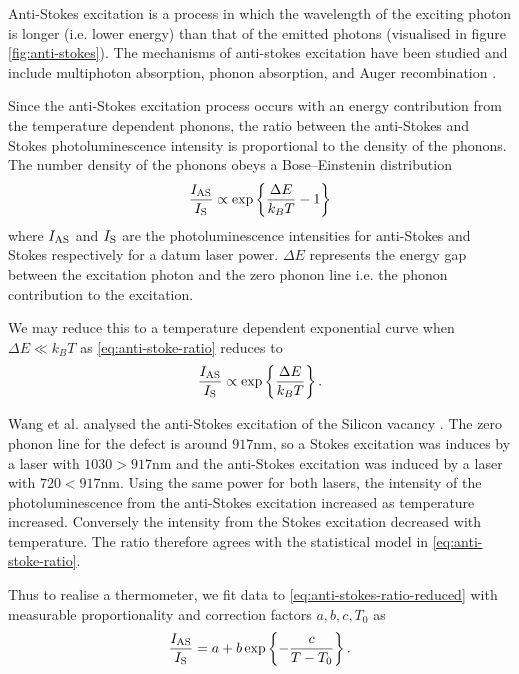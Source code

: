 Anti-Stokes excitation is a process in which the wavelength of the exciting photon is longer (i.e. lower energy) than that
of the emitted photons (visualised in figure \ref{fig:anti-stokes}).  The mechanisms of anti-stokes excitation have been studied and include multiphoton absorption, phonon absorption, and Auger recombination
\cite{Tran2019, Wang2019}.

Since the anti-Stokes excitation process occurs with an energy contribution from the temperature dependent phonons,
the ratio between the anti-Stokes and Stokes photoluminescence intensity is proportional to the density of the phonons. 
The number density of the phonons obeys a Bose–Einstenin distribution \cite{Wang2018}
\begin{equation}
    \frac{I_{\ce{AS}}}{I_{\ce{S}}} \propto \exp\left\{\frac{\Delta E}{k_B T} -1 \right\}
    \label{eq:anti-stoke-ratio}
\end{equation}
where $I_{\ce{AS}}$ and $I_{\ce{S}}$ are the photoluminescence intensities for anti-Stokes and Stokes respectively for a datum laser power. $\Delta E$ represents the energy gap between the excitation photon and the zero phonon line i.e. the phonon contribution to the excitation. 


We may reduce this to a temperature dependent exponential curve when $\Delta E \ll k_B T$ as \eqref{eq:anti-stoke-ratio} reduces to 
\begin{equation}
    \frac{I_{\ce{AS}}}{I_{\ce{S}}} \propto \exp\left\{\frac{\Delta E}{k_B T} \right\}.
    \label{eq:anti-stokes-ratio-reduced}
\end{equation}

Wang et al. analysed the anti-Stokes excitation of the Silicon vacancy \cite{Wang2021}. The zero phonon line for the defect is around $917$nm, so a Stokes excitation was induces by a laser with $1030 > 917$nm and the anti-Stokes excitation was induced by a laser with $720 < 917$nm. Using the same power for both lasers, the intensity of the photoluminescence from the anti-Stokes excitation increased as temperature increased. Conversely the intensity from the Stokes excitation decreased with temperature. The ratio therefore agrees with the statistical model in \eqref{eq:anti-stoke-ratio}. 

Thus to realise a thermometer, we fit data to \eqref{eq:anti-stokes-ratio-reduced} with measurable proportionality and correction factors $a, b, c, T_0$ as \cite{Tran2019}
\begin{equation}
    \frac{I_{\ce{AS}}}{I_{\ce{S}}} = a +  b\exp\left\{-\frac{c}{T - T_0} \right\}.
    \label{eq:}
\end{equation}

